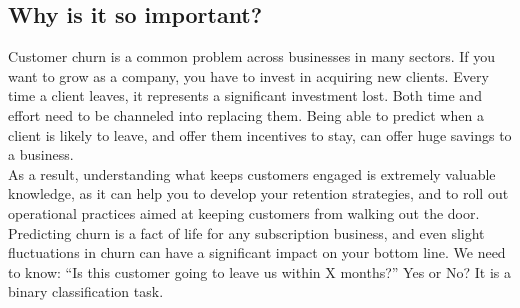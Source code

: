 \documentclass[12pt]{article}
\begin{document}
\subsection{Why is it so important?}
Customer churn is a common problem across businesses in many sectors. If you want to grow as a company, you have to invest in acquiring new clients. Every time a client leaves, it represents a significant investment lost. Both time and effort need to be channeled into replacing them. Being able to predict when a client is likely to leave, and offer them incentives to stay, can offer huge savings to a business.\\
As a result, understanding what keeps customers engaged is extremely valuable knowledge, as it can help you to develop your retention strategies, and to roll out operational practices aimed at keeping customers from walking out the door.\\
Predicting churn is a fact of life for any subscription business, and even slight fluctuations in churn can have a significant impact on your bottom line. We need to know: “Is this customer going to leave us within X months?” Yes or No? It is a binary classification task.
\end{document}
